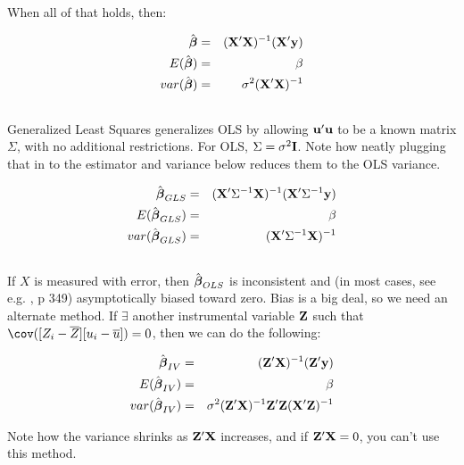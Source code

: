 When all of that holds, then:

\begin{eqnarray}
\hat{{\mbox{\boldmath$\beta$}}} &=& ({\bf X}'{\bf X})^{-1}({\bf X}'{\bf y})			\nonumber\\
E(\hat{{\mbox{\boldmath$\beta$}}}) &=& \beta					\nonumber\\
var(\hat{{\mbox{\boldmath$\beta$}}}) &=& \sigma^2({\bf X}'{\bf X})^{-1}		\nonumber
\end{eqnarray}
\subsection{}					\label{GLS}
Generalized Least Squares generalizes OLS by allowing ${\bf u}'{\bf u}$ to be a
known matrix $\Sigma$, with no additional restrictions. For OLS,
$\Sigma=\sigma^2{\bf I}$. Note how neatly plugging that in to the
estimator and variance below reduces them to the OLS variance.

\begin{eqnarray}
\hat{{\mbox{\boldmath$\beta$}}}_{GLS} &=& ({\bf X}'\Sigma^{-1}{\bf X})^{-1}({\bf X}'\Sigma^{-1}{\bf y})			\nonumber\\
E(\hat{{\mbox{\boldmath$\beta$}}}_{GLS}) &=& \beta					\nonumber\\
var(\hat{{\mbox{\boldmath$\beta$}}}_{GLS}) &=& ({\bf X}'\Sigma^{-1}{\bf X})^{-1}		\nonumber
\end{eqnarray}

\subsection{}			\label{IV}

If $X$ is measured with error, then $\hat{{\mbox{\boldmath$\beta$}}}_{OLS}$ is inconsistent
and (in most cases, see e.g. \cite{kmenta}, p 349) asymptotically biased
toward zero. Bias is a big deal, so we need an alternate method. If
$\exists$ another instrumental variable ${\bf Z}$ such that $\cov([Z_i-\overline
Z][u_i-\overline u])=0$, then we can do the following:

\begin{eqnarray}
\hat{{\mbox{\boldmath$\beta$}}}_{IV} &=& ({\bf Z}'{\bf X})^{-1}({\bf Z}'{\bf y})			\nonumber\\
E(\hat{{\mbox{\boldmath$\beta$}}}_{IV}) &=& \beta					\nonumber\\
var(\hat{{\mbox{\boldmath$\beta$}}}_{IV}) &=& 
	\sigma^2({\bf Z}'{\bf X})^{-1}{\bf Z}'{\bf Z}({\bf X}'{\bf Z})^{-1}	\nonumber
\end{eqnarray}

Note how the variance shrinks as ${\bf Z}'{\bf X}$ increases, and if
${\bf Z}'{\bf X}=0$, you can't use this method.

